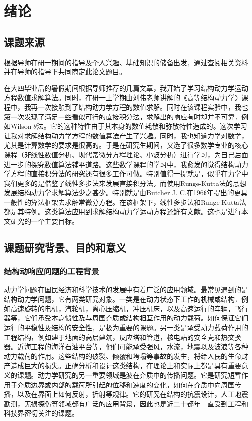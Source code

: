 \chapter{绪论}
%
\section{课题来源}
根据导师在研一期间的指导及个人兴趣、基础知识的储备出发，通过查阅相关资料并在导师的指导下共同商定此论文题目。

在大四毕业后的暑假期间根据导师推荐的几篇文章\cite{杨超2015}，我开始了学习结构动力学运动方程数值求解算法。同时，在研一上学期由刘伟老师讲解的《高等结构动力学》课程中，我再一次接触到了结构动力学方程的数值求解。同时在该课程实验中，我也第一次发现了满足一些看似可行的直接积分法，求解出的响应有时却并不可靠，例如Wilson-$\theta$法。它的这种特性由于其本身的数值耗散和弥散特性造成的。这次学习让我对求解结构动力学方程的数值算法产生了兴趣。同时，我也知道力学对数学，尤其是计算数学的要求是很高的。于是在研究生期间，又选了很多数学专业的核心课程（非线性数值分析、现代常微分方程理论、小波分析）进行学习，为自己后面进一步的探究数值算法铺平道路。这些数学课程的学习中，我愈发的觉得结构动力学方程的直接积分法的研究还有很多工作可做。特别值得一提就是，似乎在力学中我们更多的是借鉴了线性多步法来发展直接积分法，而使用Runge-Kutta法的思想发展结构动力学求解算法少之甚少。特别就是由Butcher J. C.在1966年提出的更具一般性的算法框架去求解常微分方程\cite{Butcher1966}。在该框架下，线性多步法和Runge-Kutta法都是其特例。这类算法应用到求解结构动力学运动方程还鲜有文献。这也是进行本文研究的一个主要目标。
\section{课题研究背景、目的和意义}
\subsection{结构动响应问题的工程背景}
动力学问题在国民经济和科学技术的发展中有着广泛的应用领域。最常见遇到的是结构动力学问题，它有两类研究对象。一类是在动力状态下工作的机械或结构，例如高速旋转的电机，汽轮机，离心压缩机，冲压机床，以及高速运行的车辆，飞行器等，它们承受本身惯性及与周围介质或结构相互作用的动力载荷。如何保证它们运行的平稳性及结构的安全性，是极为重要的课题。另一类是承受动力载荷作用的工程结构，例如建于地面的高层建筑，反应塔和管道，核电站的安全壳和热交换器。近海工程的海洋石油平台等，他们可能承受强风，水流，地震以及波浪等各种动力载荷的作用。这些结构的破裂、倾覆和垮塌等事故的发生，将给人民的生命财产造成巨大的损失。正确分析和设计这类结构，在理论上和实际上都是具有重要意义的课题。动力学研究的另一重要领域是波在介质中的传播问题。它是研究短暂作用于介质边界或内部的载荷所引起的位移和速度的变化，如何在介质中向周围传播，以及在界面上如何反射，折射等规律。它的研究在结构的抗震设计，人工地震勘测，无损探伤等领域都有广泛的应用背景，因此也是近二十都年一直受到工程和科技界密切关注的课题。
